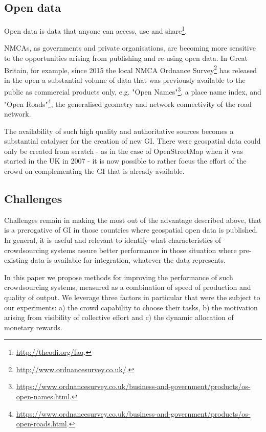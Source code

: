 \documentclass{llncs}
\begin{document}
\subsection{Open data}

Open data is data that anyone can access, use and share\footnote{\url{http://theodi.org/faq}.}. 

NMCAs, as governments and private organisations, are becoming more sensitive to the opportunities arising from publishing and re-using open data. In Great Britain, for example, since 2015 the local NMCA Ordnance Survey\footnote{\url{http://www.ordnancesurvey.co.uk/}.} has released in the open a substantial volume of data that was previously available to the public as commercial products only, e.g. "Open Names"\footnote{\url{https://www.ordnancesurvey.co.uk/business-and-government/products/os-open-names.html}.}, a place name index, and "Open Roads"\footnote{\url{https://www.ordnancesurvey.co.uk/business-and-government/products/os-open-roads.html}.}, the generalised geometry and network connectivity of the road network.

The availability of such high quality and authoritative sources becomes a substantial catalyser for the creation of new GI. There were geospatial data could only be created from scratch - as in the case of OpenStreetMap when it was started in the UK in 2007 - it is now possible to rather focus the effort of the crowd on complementing the GI that is already available.

\subsection{Challenges}

Challenges remain in making the most out of the advantage described above, that is a prerogative of GI in those countries where geospatial open data is published. In general, it is useful and relevant to identify what characteristics of crowdsourcing systems assure better performance in those situation where pre-existing data is available for integration, whatever the data represents. 

In this paper we propose methods for improving the performance of such crowdsourcing systems, measured as a combination of speed of production and quality of output. We leverage three factors in particular that were the subject to our experiments: a) the crowd capability to choose their tasks, b) the motivation arising from visibility of collective effort and c) the dynamic allocation of monetary rewards.
\end{document}
